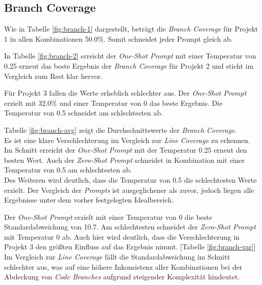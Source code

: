 \subsection{Branch Coverage}
Wie in Tabelle \ref{fig:branch-1} dargestellt, beträgt die \textit{Branch Coverage} für Projekt 1 in allen Kombinationen 50.0\%. Somit schneidet jeder Prompt gleich ab.

In Tabelle \ref{fig:branch-2} erreicht der \textit{One-Shot Prompt} mit einer Temperatur von 0.25 erneut das beste Ergebnis der \textit{Branch Coverage} für Projekt 2 und sticht im Vergleich zum Rest klar hervor.

Für Projekt 3 fallen die Werte erheblich schlechter aus. Der \textit{One-Shot Prompt} erzielt mit 32.0\% und einer Temperatur von 0 das beste Ergebnis. Die Temperatur von 0.5 schneidet am schlechtesten ab.

Tabelle \ref{fig:branch-avg} zeigt die Durchschnittswerte der \textit{Branch Coverage}. \\Es ist eine klare Verschlechterung im Vergleich zur \textit{Line Coverage} zu erkennen. Im Schnitt erreicht der \textit{One-Shot Prompt} mit der Temperatur 0.25 erneut den besten Wert. Auch der \textit{Zero-Shot Prompt} schneidet in Kombination mit einer Temperatur von 0.5 am schlechtesten ab.\\ Des Weiteren wird deutlich, dass die Temperatur von 0.5 die schlechtesten Werte erzielt. Der Vergleich der \textit{Prompts} ist ausgeglichener als zuvor, jedoch liegen alle Ergebnisse unter dem vorher festgelegten Idealbereich.

Der \textit{One-Shot Prompt} erzielt mit einer Temperatur von 0 die beste Standardabweichung von 10.7. Am schlechtesten schneidet der \textit{Zero-Shot Prompt} mit Temperatur 0 ab. Auch hier wird deutlich, dass die Verschlechterung in Projekt 3 den größten Einfluss auf das Ergebnis nimmt. [Tabelle \ref{fig:branch-var}] Im Vergleich zur \textit{Line Coverage} fällt die Standardabweichung im Schnitt schlechter aus, was auf eine höhere Inkonsistenz aller Kombinationen bei der Abdeckung von \textit{Code Branches} aufgrund steigender Komplexität hindeutet.


